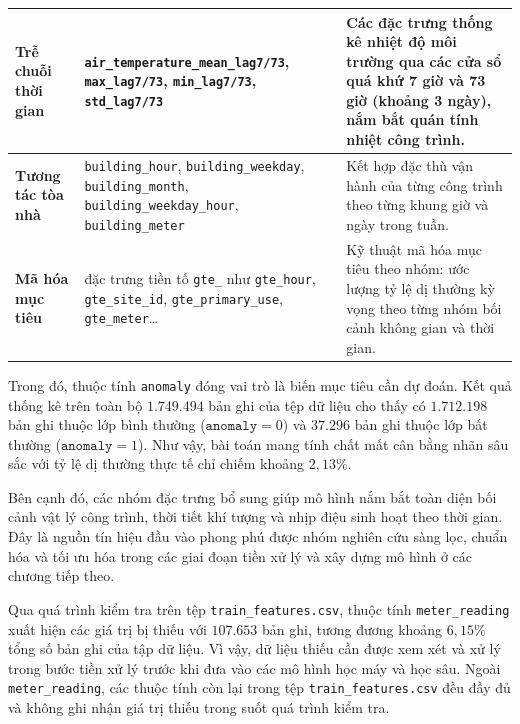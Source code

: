 \begin{table}[H]
{\begin{tabular}{|l|>{\raggedright\arraybackslash}p{5.0cm}|>{\raggedright\arraybackslash}p{8.5cm}|}
\textbf{Trễ chuỗi thời gian} & \texttt{air\_temperature\_}\allowbreak\texttt{mean\_lag7/73}, \texttt{max\_lag7/73}, \texttt{min\_lag7/73}, \texttt{std\_lag7/73} & Các đặc trưng thống kê nhiệt độ môi trường qua các cửa sổ quá khứ 7 giờ và 73 giờ (khoảng 3 ngày), nắm bắt quán tính nhiệt công trình. \\ \hline
\textbf{Tương tác tòa nhà} & \texttt{building\_hour}, \texttt{building\_weekday}, \texttt{building\_month}, \texttt{building\_weekday\_hour}, \texttt{building\_meter} & Kết hợp đặc thù vận hành của từng công trình theo từng khung giờ và ngày trong tuần. \\ \hline
\textbf{Mã hóa mục tiêu} & 16 đặc trưng tiền tố \texttt{gte\_} như \texttt{gte\_hour}, \texttt{gte\_site\_id}, \texttt{gte\_primary\_use}, \texttt{gte\_meter}\dots & Kỹ thuật mã hóa mục tiêu theo nhóm: ước lượng tỷ lệ dị thường kỳ vọng theo từng nhóm bối cảnh không gian và thời gian. \\ \hline
\end{tabular}
}
\end{table}

Trong đó, thuộc tính \texttt{anomaly} đóng vai trò là biến mục tiêu cần dự đoán. Kết quả thống kê trên toàn bộ $1{.}749{.}494$ bản ghi của tệp dữ liệu cho thấy có $1{.}712{.}198$ bản ghi thuộc lớp bình thường ($\texttt{anomaly}=0$) và $37{.}296$ bản ghi thuộc lớp bất thường ($\texttt{anomaly}=1$). Như vậy, bài toán mang tính chất mất cân bằng nhãn sâu sắc với tỷ lệ dị thường thực tế chỉ chiếm khoảng $2{,}13\%$.

Bên cạnh đó, các nhóm đặc trưng bổ sung giúp mô hình nắm bắt toàn diện bối cảnh vật lý công trình, thời tiết khí tượng và nhịp điệu sinh hoạt theo thời gian. Đây là nguồn tín hiệu đầu vào phong phú được nhóm nghiên cứu sàng lọc, chuẩn hóa và tối ưu hóa trong các giai đoạn tiền xử lý và xây dựng mô hình ở các chương tiếp theo.

Qua quá trình kiểm tra trên tệp \texttt{train\_features.csv}, thuộc tính \texttt{meter\_reading} xuất hiện các giá trị bị thiếu với $107{.}653$ bản ghi, tương đương khoảng $6{,}15\%$ tổng số bản ghi của tập dữ liệu. Vì vậy, dữ liệu thiếu cần được xem xét và xử lý trong bước tiền xử lý trước khi đưa vào các mô hình học máy và học sâu. Ngoài \texttt{meter\_reading}, các thuộc tính còn lại trong tệp \texttt{train\_features.csv} đều đầy đủ và không ghi nhận giá trị thiếu trong suốt quá trình kiểm tra.
